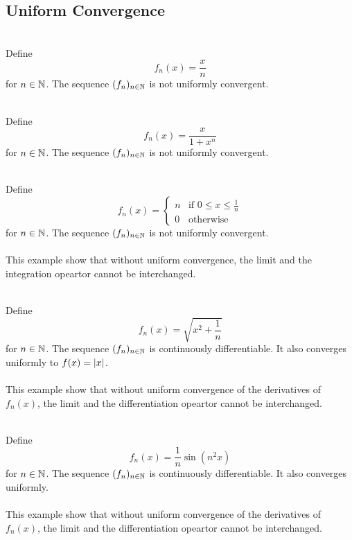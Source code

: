 \documentclass[a4paper]{article}
\begin{document}
\subsection{Uniform Convergence}
\begin{eg}{}{}\\ Define $$f_n(x)=\frac{x}{n}$$ for $n\in\mathbb{N}$. The sequence $(f_n)_{n\in\mathbb{N}}$ is not uniformly convergent. 
\end{eg}

\begin{eg}{}{}\\ Define $$f_n(x)=\frac{x}{1+x^n}$$ for $n\in\mathbb{N}$. The sequence $(f_n)_{n\in\mathbb{N}}$ is not uniformly convergent. 
\end{eg}

\begin{eg}{}{}\\ Define $$f_n(x)=\begin{cases}
n & \text{if }0\leq x\leq\frac{1}{n}\\
0 & \text{otherwise }
\end{cases}$$ for $n\in\mathbb{N}$. The sequence $(f_n)_{n\in\mathbb{N}}$ is not uniformly convergent. \\~\\
This example show that without uniform convergence, the limit and the integration opeartor cannot be interchanged. 
\end{eg}

\begin{eg}{}{}\\ Define $$f_n(x)=\sqrt{x^2+\frac{1}{n}}$$ for $n\in\mathbb{N}$. The sequence $(f_n)_{n\in\mathbb{N}}$ is continuously differentiable. It also converges uniformly to $f(x)=\abs{x}$. \\~\\
This example show that without uniform convergence of the derivatives of $f_n(x)$, the limit and the differentiation opeartor cannot be interchanged. 
\end{eg}

\begin{eg}{}{}\\ Define $$f_n(x)=\frac{1}{n}\sin(n^2x)$$ for $n\in\mathbb{N}$. The sequence $(f_n)_{n\in\mathbb{N}}$ is continuously differentiable. It also converges uniformly. \\~\\
This example show that without uniform convergence of the derivatives of $f_n(x)$, the limit and the differentiation opeartor cannot be interchanged. 
\end{eg}
\end{document}
